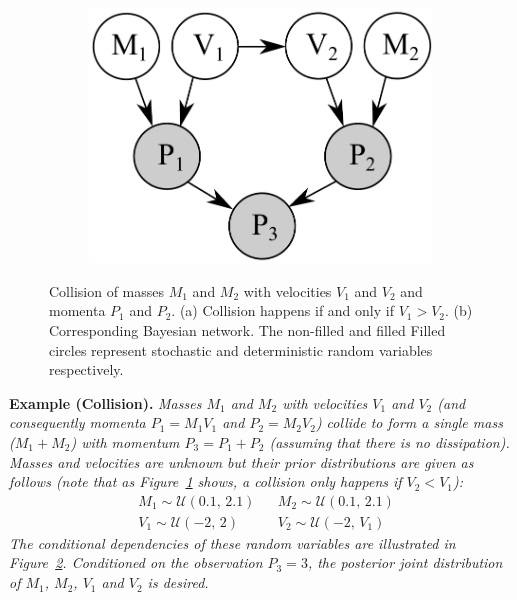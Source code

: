 \documentclass[letterpaper]{article}
\begin{document}
\begin{figure}
\begin{center}
\begin{center}
\begin{subfigure}{0.19\linewidth}
                \label{fig:mom0}
        \end{subfigure}%
\qquad
\begin{subfigure}{0.52\linewidth}
                \includegraphics[width=0.80\linewidth]{Figs/little-momentum1.pdf}
                \caption{}
                \label{fig:mom00}
        \end{subfigure}%
\end{center}
\vspace{-1mm}
\caption{\footnotesize 
Collision of masses $M_1$ and $M_2$ with velocities $V_1$ and $V_2$ and momenta $P_1$ and $P_2$. 
(a) Collision happens if and only if $V_1>V_2$. (b) Corresponding Bayesian network. The non-filled and filled Filled circles represent stochastic and deterministic random variables respectively.} 
\label{fig:mom2}
\vspace{-4mm}
\end{center}
\end{figure}

{\bf Example (Collision). }
\emph{Masses $M_1$ and $M_2$ with velocities $V_1$ and $V_2$ (and consequently momenta $P_1 = M_1 V_1$ and $P_2 = M_2 V_2$) collide to form a single mass ($M_1 + M_2$) with momentum $P_3 = P_1 + P_2$ (assuming that there is no dissipation).
Masses and velocities are unknown but 
their prior distributions are given as follows (note that as Figure~\ref{fig:mom0} shows, a collision only happens if $V_2 < V_1$):  
}%
{\footnotesize
\begin{align*}
&M_1 \sim \mathcal{U}(0.1, \, 2.1) 
&&M_2 \sim \mathcal{U}(0.1, \, 2.1)
\\
&V_1 \sim \mathcal{U}(-2, \, 2)
&&V_2 \sim \mathcal{U}(-2, \, V_1)
\end{align*} 
\emph{
The conditional dependencies of these random variables are illustrated in 
Figure~\ref{fig:mom00}.
Conditioned on the observation $P_3 = 3$, the posterior joint distribution of $M_1$, $M_2$, $V_1$ and $V_2$ is desired. 
} %
}
\end{document}
